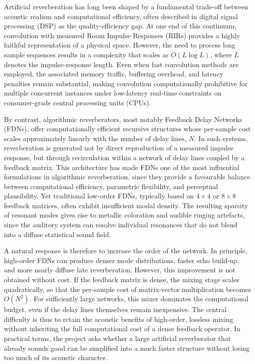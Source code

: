 \documentclass[12pt,a4paper]{article}
\begin{document}
Artificial reverberation has long been shaped by a fundamental trade-off between
acoustic realism and computational efficiency, often described in digital signal
processing (DSP) as the quality-efficiency gap. At one end of this continuum,
convolution with measured Room Impulse Responses (RIRs) provides a highly faithful
representation of a physical space. However, the need to process long sample
sequences results in a complexity that scales as $O(L \log L)$, where $L$ denotes
the impulse-response length. Even when fast convolution methods are employed,
the associated memory traffic, buffering overhead, and latency penalties remain
substantial, making convolution computationally prohibitive for multiple concurrent
instances under low-latency real-time constraints on consumer-grade central
processing units (CPUs).

By contrast, algorithmic reverberators, most notably Feedback Delay Networks
(FDNs), offer computationally efficient recursive structures whose per-sample cost
scales approximately linearly with the number of delay lines, $N$. In such systems,
reverberation is generated not by direct reproduction of a measured impulse response,
but through recirculation within a network of delay lines coupled by a feedback
matrix. This architecture has made FDNs one of the most influential formulations
in algorithmic reverberation, since they provide a favourable balance between
computational efficiency, parametric flexibility, and perceptual plausibility.
Yet traditional low-order FDNs, typically based on $4 \times 4$ or $8 \times 8$
feedback matrices, often exhibit insufficient modal density. The resulting sparsity
of resonant modes gives rise to metallic coloration and audible ringing artefacts,
since the auditory system can resolve individual resonances that do not blend into
a diffuse statistical sound field.

A natural response is therefore to increase the order of the network. In principle,
high-order FDNs can produce denser mode distributions, faster echo build-up, and
more nearly diffuse late reverberation. However, this improvement is not obtained
without cost. If the feedback matrix is dense, the mixing stage scales quadratically,
so that the per-sample cost of matrix-vector multiplication becomes $O(N^2)$.
For sufficiently large networks, this mixer dominates the computational budget,
even if the delay lines themselves remain inexpensive. The central difficulty is
thus to retain the acoustic benefits of high-order, lossless mixing without
inheriting the full computational cost of a dense feedback operator. In
practical terms, the project asks whether a large artificial reverberator that
already sounds good can be simplified into a much faster structure without
losing too much of its acoustic character.
\end{document}
